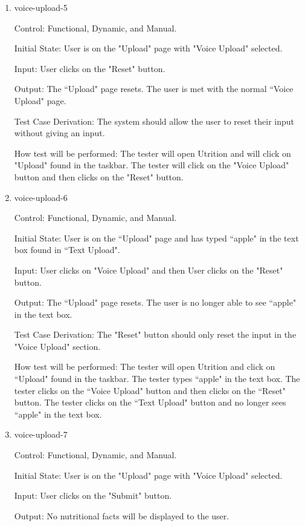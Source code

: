\documentclass[12pt, titlepage]{article}
\begin{document}
\begin{enumerate}
	\item{voice-upload-5\\}
	
	Control: Functional, Dynamic, and Manual.
	
	Initial State: User is on the "Upload" page with "Voice Upload" selected.
	
	Input: User clicks on the "Reset" button.
	
	Output: The ``Upload" page resets. The user is met with the normal ``Voice Upload" page.
	
	Test Case Derivation: The system should allow the user to reset their input without giving an input.
	
	How test will be performed: The tester will open Utrition and will click on "Upload" found in the taskbar. The tester will click on the "Voice Upload" button and then clicks on the "Reset" button. 
	
	\item{voice-upload-6\\}
	
	Control: Functional, Dynamic, and Manual.
	
	Initial State: User is on the ``Upload" page and has typed ``apple" in the text box found in ``Text Upload".
	
	Input: User clicks on "Voice Upload" and then User clicks on the "Reset" button.
	
	Output: The ``Upload" page resets. The user is no longer able to see ``apple" in the text box.
	
	Test Case Derivation: The "Reset" button should only reset the input in the "Voice Upload" section.
	
	How test will be performed: The tester will open Utrition and click on ``Upload" found in the taskbar. The tester types ``apple" in the text box. The tester clicks on the ``Voice Upload" button and then clicks on the ``Reset" button. The tester clicks on the ``Text Upload" button and no longer sees ``apple" in the text box.
	
	\item{voice-upload-7\\}
	
	Control: Functional, Dynamic, and Manual.
	
	Initial State: User is on the "Upload" page with "Voice Upload" selected.
	
	Input: User clicks on the "Submit" button.
	
	Output: No nutritional facts will be displayed to the user.
	

\end{enumerate}
\end{document}
